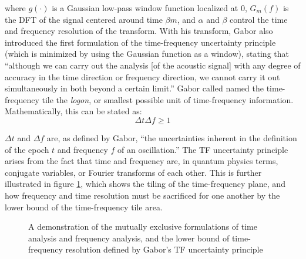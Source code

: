 \documentclass[letter,12pt,notitlepage]{article}
\begin{document}
where $g(\cdot)$ is a Gaussian low-pass window function localized at 0, $G_{m}(f)$ is the DFT of the signal centered around time $\beta m$, and $\alpha$ and $\beta$ control the time and frequency resolution of the transform. With his transform, Gabor also introduced the first formulation of the time-frequency uncertainty principle (which is minimized by using the Gaussian function as a window), stating that ``although we can carry out the analysis [of the acoustic signal] with any degree of accuracy in the time direction or frequency direction, we cannot carry it out simultaneously in both beyond a certain limit.'' Gabor called named the time-frequency tile the \textit{logon}, or smallest possible unit of time-frequency information. Mathematically, this can be stated as:
\[ \Delta t\Delta f \ge 1 \]

$\Delta t$ and $\Delta f$ are, as defined by Gabor, ``the uncertainties inherent in the definition of the epoch $t$ and frequency $f$ of an oscillation.'' The TF uncertainty principle arises from the fact that time and frequency are, in quantum physics terms, conjugate variables, or Fourier transforms of each other. This is further illustrated in figure \ref{fig:gabortf}, which shows the tiling of the time-frequency plane, and how frequency and time resolution must be sacrificed for one another by the lower bound of the time-frequency tile area.

\begin{figure}[ht]
	\centering
	\hspace{0.1em}
	\caption{A demonstration of the mutually exclusive formulations of time analysis and frequency analysis, and the lower bound of time-frequency resolution defined by Gabor's TF uncertainty principle \cite{gabordiagrams}}
	\label{fig:gabortf}
\end{figure}
\end{document}
